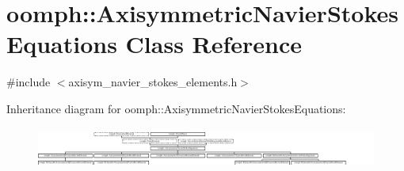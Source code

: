 \hypertarget{classoomph_1_1AxisymmetricNavierStokesEquations}{}\section{oomph\+:\+:Axisymmetric\+Navier\+Stokes\+Equations Class Reference}
\label{classoomph_1_1AxisymmetricNavierStokesEquations}


{\ttfamily \#include $<$axisym\+\_\+navier\+\_\+stokes\+\_\+elements.\+h$>$}

Inheritance diagram for oomph\+:\+:Axisymmetric\+Navier\+Stokes\+Equations\+:\begin{figure}[H]
\begin{center}
\leavevmode
\includegraphics[height=1.368524cm]{classoomph_1_1AxisymmetricNavierStokesEquations}
\end{center}
\end{figure}
